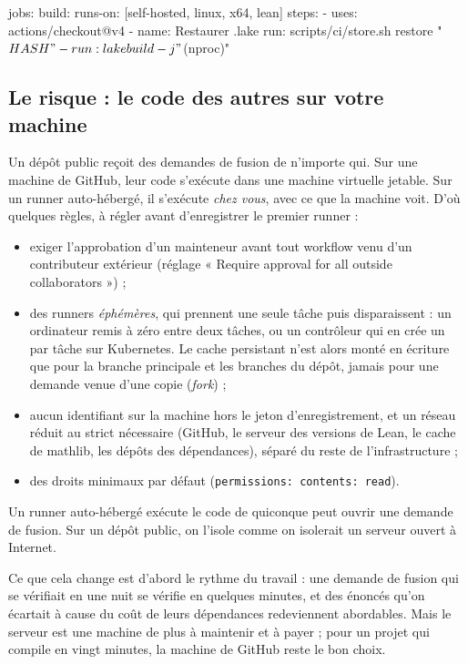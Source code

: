 \begin{terminal}
jobs:
  build:
    runs-on: [self-hosted, linux, x64, lean]
    steps:
      - uses: actions/checkout@v4
      - name: Restaurer .lake
        run: scripts/ci/store.sh restore "$HASH"
      - run: lake build -j "$(nproc)"
\end{terminal}

\subsection*{Le risque : le code des autres sur votre machine}

Un dépôt public reçoit des demandes de fusion de n'importe qui. Sur une machine de GitHub, leur
code s'exécute dans une machine virtuelle jetable. Sur un runner auto-hébergé, il s'exécute
\emph{chez vous}, avec ce que la machine voit. D'où quelques règles, à régler avant d'enregistrer
le premier runner :

\begin{itemize}
  \item exiger l'approbation d'un mainteneur avant tout workflow venu d'un contributeur
        extérieur (réglage « Require approval for all outside collaborators ») ;
  \item des runners \emph{éphémères}, qui prennent une seule tâche puis disparaissent : un
        ordinateur remis à zéro entre deux tâches, ou un contrôleur qui en crée un par tâche
        sur Kubernetes. Le cache persistant n'est alors monté en écriture que pour la branche
        principale et les branches du dépôt, jamais pour une demande venue d'une copie
        (\emph{fork}) ;
  \item aucun identifiant sur la machine hors le jeton d'enregistrement, et un réseau réduit au
        strict nécessaire (GitHub, le serveur des versions de Lean, le cache de mathlib, les
        dépôts des dépendances), séparé du reste de l'infrastructure ;
  \item des droits minimaux par défaut (\texttt{permissions: contents: read}).
\end{itemize}

\begin{regle}
Un runner auto-hébergé exécute le code de quiconque peut ouvrir une demande de fusion. Sur un
dépôt public, on l'isole comme on isolerait un serveur ouvert à Internet.
\end{regle}

\begin{tipblock}
Ce que cela change est d'abord le rythme du travail : une demande de fusion qui se vérifiait en
une nuit se vérifie en quelques minutes, et des énoncés qu'on écartait à cause du coût de leurs
dépendances redeviennent abordables. Mais le serveur est une machine de plus à maintenir et à
payer ; pour un projet qui compile en vingt minutes, la machine de GitHub reste le bon choix.
\end{tipblock}

